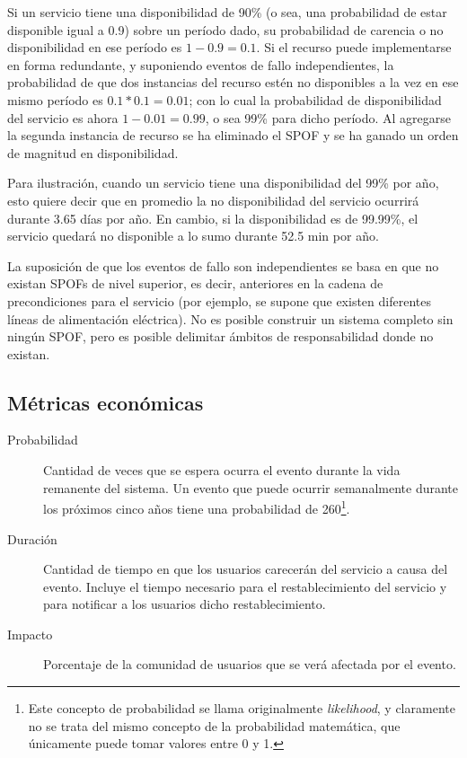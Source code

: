 Si un servicio tiene una disponibilidad de 90\% (o sea, una probabilidad de estar disponible igual a 0.9) sobre un período dado, su probabilidad de carencia o no disponibilidad en ese período es $1 - 0.9 = 0.1$. Si el recurso puede implementarse en forma redundante, y suponiendo eventos de fallo independientes, la probabilidad de que dos instancias del recurso estén no disponibles a la vez en ese mismo período es $0.1 * 0.1 = 0.01$; con lo cual la probabilidad de disponibilidad del servicio es ahora $1 - 0.01 = 0.99$, o sea 99\% para dicho período. Al agregarse la segunda instancia de recurso se ha eliminado el SPOF y se ha ganado un orden de magnitud en disponibilidad.
 
Para ilustración, cuando un servicio tiene una disponibilidad del 99\% por año, esto quiere decir que en promedio la no disponibilidad del servicio ocurrirá durante 3.65 días por año. En cambio, si la disponibilidad es de 99.99\%, el servicio quedará no disponible a lo sumo durante 52.5 min por año.

La suposición de que los eventos de fallo son independientes se basa en que no existan SPOFs de nivel superior, es decir, anteriores en la cadena de precondiciones para el servicio (por ejemplo, se supone que existen diferentes líneas de alimentación eléctrica). No es posible construir un sistema completo sin ningún SPOF, pero es posible delimitar ámbitos de responsabilidad donde no existan.



\subsection{Métricas económicas}

\begin{description}
\item [Probabilidad] Cantidad de veces que se espera ocurra el evento durante la vida remanente del sistema. Un evento que puede ocurrir semanalmente durante los próximos cinco años tiene una probabilidad de 260\footnote{Este concepto de probabilidad se llama originalmente \textit{likelihood}, y claramente no se trata del mismo concepto de la probabilidad matemática, que únicamente puede tomar valores entre 0 y 1.}.
\item [Duración] Cantidad de tiempo en que los usuarios carecerán del servicio a causa del evento. Incluye el tiempo necesario para el restablecimiento del servicio y para notificar a los usuarios dicho restablecimiento.
\item [Impacto] Porcentaje de la comunidad de usuarios que se verá afectada por el evento.
\end{description}

